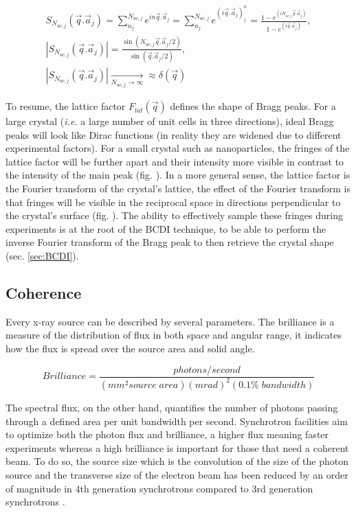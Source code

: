 \begin{gather}
    \label{eq:SFunction1}
    S_{N_{uc, j}}(\vec{q}.\vec{a}_j) = \sum_{n_j}^{N_{uc, j}} e^{in\vec{q}.\vec{a}_j} = \sum_{n_j}^{N_{uc, j}} e^{(i\vec{q}.\vec{a}_j)^n_j} = \frac{1-e^{(i N_{uc, j} \vec{q}.\vec{a}_j)}}{1-e^{(i\vec{q}.\vec{a}_j)}},\\
    \label{eq:SFunction2}
    |S_{N_{uc, j}}(\vec{q}.\vec{a}_j)| = \frac{\sin(N_{uc, j} \vec{q}.\vec{a}_j/2)}{\sin(\vec{q}.\vec{a}_j/2)},\\
    \label{eq:SFunction3}
    |S_{N_{uc, j}}(\vec{q}.\vec{a}_j)| \underset{N_{uc, j} \to \infty}{\longrightarrow} \approx \delta (\vec{q})
\end{gather}

To resume, the lattice factor $F_{lat}(\vec{q})$ defines the shape of Bragg peaks.
For a large crystal (\textit{i.e.} a large number of unit cells in three directions), ideal Bragg peaks will look like Dirac functions (in reality they are widened due to different experimental factors).
For a small crystal such as nanoparticles, the fringes of the lattice factor will be further apart and their intensity more visible in contrast to the intensity of the main peak (fig. ).
In a more general sense, the lattice factor is the Fourier transform of the crystal's lattice, the effect of the Fourier transform is that fringes will be visible in the reciprocal space in directions perpendicular to the crystal's surface (fig. ).
The ability to effectively sample these fringes during experiments is at the root of the BCDI technique, to be able to perform the inverse Fourier transform of the Bragg peak to then retrieve the crystal shape (sec. \ref{sec:BCDI}).


\subsection{Coherence} \label{sec:Coherence}

Every x-ray source can be described by several parameters.
The brilliance is a measure of the distribution of flux in both space and angular range, it indicates how the flux is spread over the source area and solid angle.

\begin{equation}
    Brilliance = \frac{photons/second}{(mm^2 source \; area)(mrad)^2(0.1\% \; bandwidth)}
\end{equation}

The spectral flux, on the other hand, quantifies the number of photons passing through a defined area per unit bandwidth per second.
Synchrotron facilities aim to optimize both the photon flux and brilliance, a higher flux meaning faster experiments whereas a high brilliance is important for those that need a coherent beam.
To do so, the source size which is the convolution of the size of the photon source and the transverse size of the electron beam has been reduced by an order of magnitude in 4th generation synchrotrons compared to 3rd generation synchrotrons \parencite{Willmott}.

